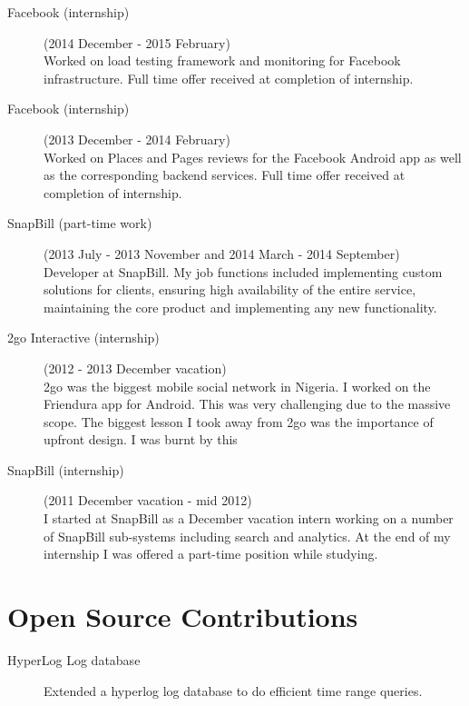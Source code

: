 \documentclass[margin,line,a4paper]{resume}
\begin{document}
\begin{resume}
\begin{description}
                \item[Facebook (internship)] (2014 December - 2015 February) \\
                    Worked on load testing framework and monitoring for Facebook infrastructure.
                    Full time offer received at completion of internship.

                \item[Facebook (internship)] (2013 December - 2014 February) \\
                    Worked on Places and Pages reviews for the Facebook Android app as well as the corresponding
                    backend services. Full time offer received at completion of internship.

                \item[SnapBill (part-time work)] (2013 July - 2013 November and 2014 March - 2014 September) \\
                    Developer at SnapBill. My job functions included implementing custom solutions for clients,
                    ensuring high availability of the entire service, maintaining the
                    core product and implementing any new functionality. 
                \item[2go Interactive (internship)] (2012 - 2013 December vacation) \\
                    2go was the biggest mobile social network in Nigeria. I worked on the Friendura app for Android. 
                    This was very challenging due to the massive scope. The biggest lesson I took away from 
                    2go was the importance of upfront design. I was burnt by this 


                \item[SnapBill (internship)] (2011 December vacation - mid 2012) \\
                    I started at SnapBill as a December vacation intern working on a number of SnapBill 
                    sub-systems including search and analytics. At the end of my internship I was offered a part-time position while studying. 
            \end{description}

        \section{\mysidestyle Open Source Contributions}
            \begin{description}
                \item[HyperLog Log database] Extended a hyperlog log database to do efficient time range queries.
            \end{description}


\end{resume}
\end{document}
